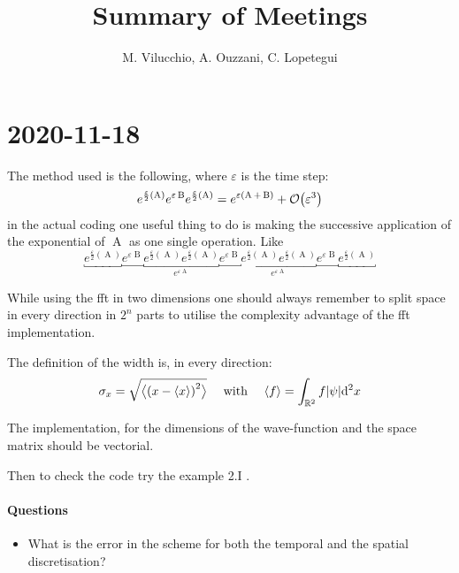 \documentclass[12pt, oneside]{article}
\title{Summary of Meetings}
\author{M. Vilucchio, A. Ouzzani, C. Lopetegui}
\begin{document}
\maketitle
\section{2020-11-18}

The method used is the following, where $\varepsilon$ is the time step:
\[
	e^{\frac{\varepsilon}{2} (\operatorname{A})} e^{\varepsilon \operatorname{B}}e^{\frac{\varepsilon}{2} (\operatorname{A})} = e^{\varepsilon (\operatorname{A} + \operatorname{B})} + \order{\varepsilon^3}
\]
in the actual coding one useful thing to do is making the successive application of the exponential of $\operatorname{A}$ as one single operation. Like
\[
	\underbracket{e^{\frac{\varepsilon}{2} (\operatorname{A})}} \underbracket{e^{\varepsilon \operatorname{B}} }\underbracket{e^{\frac{\varepsilon}{2} (\operatorname{A})} e^{\frac{\varepsilon}{2} (\operatorname{A})} }_{e^{\varepsilon \operatorname{A}}} \underbracket{e^{\varepsilon \operatorname{B}} } \underbracket{e^{\frac{\varepsilon}{2} (\operatorname{A})} e^{\frac{\varepsilon}{2} (\operatorname{A})} }_{e^{\varepsilon \operatorname{A}}} \underbracket{ e^{\varepsilon \operatorname{B}} } \underbracket{e^{\frac{\varepsilon}{2} (\operatorname{A})} }
\]

While using the fft in two dimensions one should always remember to split space in every direction in $2^n$ parts to utilise the complexity advantage of the fft implementation.

The definition of the width is, in every direction:
\[
	\sigma_x = \sqrt{ \big\langle \qty(x - \langle x\rangle)^2\big\rangle}\quad \text{ with } \quad\langle f \rangle = \int_{\mathbb{R}^2} f \abs{\psi} \dd[2]x
\]

The implementation, for the dimensions of the wave-function and the space matrix should be vectorial.

Then to check the code try the example 2.I .

\paragraph{Questions}
\begin{itemize}
	\item What is the error in the scheme for both the temporal and the spatial discretisation?
\end{itemize}
\end{document}

